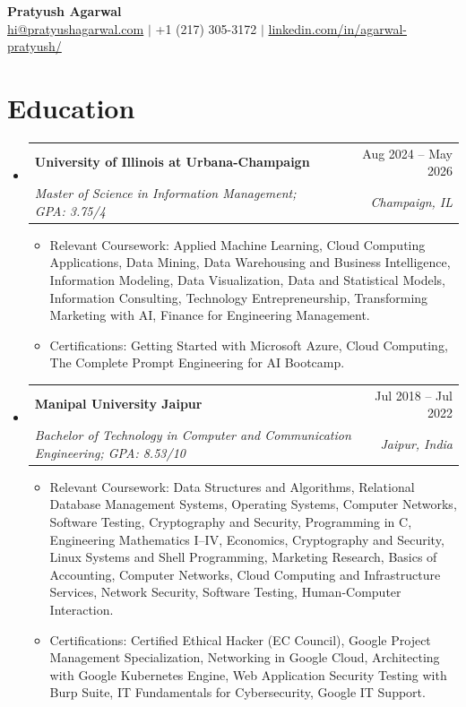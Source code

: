 \documentclass[letterpaper,11pt]{article}
\makeatletter
\newcommand{\resumeSubheading}[4]{
  \vspace{0pt}\item
    \begin{tabular*}{\textwidth}{l@{\extracolsep{\fill}}r}
      \textbf{#1} & #2 \\
      \textit{#3} & \textit{#4} \\ 
    \end{tabular*}\vspace{-2pt}
}
\newcommand{\resumeEducationCoursework}[2]{
  \vspace{-12pt} 
  \begin{itemize}[leftmargin=0pt, label={}]
    \item {#1: #2}
  \end{itemize}
}
\newcommand{\resumeEducationCertifications}[2]{
  \vspace{-14pt} 
  \begin{itemize}[leftmargin=0pt, label={}]
    \item {#1: #2}
  \end{itemize}
}
\newcommand{\resumeSubHeadingListStart}{\begin{itemize}[leftmargin=0pt,label={},itemsep=-2pt]}
\newcommand{\resumeSubHeadingListEnd}{\end{itemize}}
\makeatother
\begin{document}
\begin{center}
    \textbf{\LARGE Pratyush Agarwal} \\ \vspace{5pt}
    \href{mailto:hi@pratyushagarwal.com}{hi@pratyushagarwal.com} $|$ +1 (217) 305-3172 $|$ \href{https://linkedin.com/in/agarwal-pratyush/}{linkedin.com/in/agarwal-pratyush/}
\end{center}

\section{Education}
  \resumeSubHeadingListStart
    \resumeSubheading
      {University of Illinois at Urbana-Champaign}{Aug 2024 -- May 2026}
      {Master of Science in Information Management; GPA: 3.75/4}{Champaign, IL} 
      \resumeEducationCoursework{Relevant Coursework}{Applied Machine Learning, Cloud Computing Applications, Data Mining, Data Warehousing and Business Intelligence, Information Modeling, Data Visualization, Data and Statistical Models, Information Consulting, Technology Entrepreneurship, Transforming Marketing with AI, Finance for Engineering Management.} 
      \resumeEducationCertifications{Certifications}{Getting Started with Microsoft Azure, Cloud Computing, The Complete Prompt Engineering for AI Bootcamp.}

    \resumeSubheading
      {Manipal University Jaipur}{Jul 2018 -- Jul 2022}
      {Bachelor of Technology in Computer and Communication Engineering; GPA: 8.53/10}{Jaipur, India}
      \resumeEducationCoursework{Relevant Coursework}{Data Structures and Algorithms, Relational Database Management Systems, Operating Systems, Computer Networks, Software Testing, Cryptography and Security, Programming in C, Engineering Mathematics I–IV, Economics, Cryptography and Security, Linux Systems and Shell Programming, Marketing Research, Basics of Accounting, Computer Networks, Cloud Computing and Infrastructure Services, Network Security, Software Testing, Human-Computer Interaction.}
      \resumeEducationCertifications{Certifications}{Certified Ethical Hacker (EC Council), Google Project Management Specialization, Networking in Google Cloud, Architecting with Google Kubernetes Engine, Web Application Security Testing with Burp Suite, IT Fundamentals for Cybersecurity, Google IT Support.}
  \resumeSubHeadingListEnd

\end{document}
